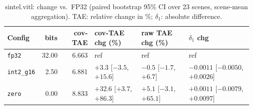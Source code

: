 \begin{table}[t]
\centering
\small
\caption{sintel.vitl: change vs.\ FP32 (paired bootstrap 95\% CI over 23 scenes, scene-mean aggregation). TAE: relative change in \%; $\delta_1$: absolute difference.}
\label{tab:boot_sintel_vitl_sm}
\begin{tabular}{lrrlll}
\toprule
Config & bits & cov-TAE & cov-TAE chg (\%) & raw TAE chg (\%) & $\delta_1$ chg \\
\midrule
\texttt{fp32} & 32.00 & 6.663 & ref & ref & ref \\
\texttt{int2\_g16} & 2.50 & 6.881 & $+3.3$ [$-3.5$, $+15.6$] & $-0.5$ [$-1.7$, $+6.7$] & $-0.0011$ [$-0.0050$, $+0.0026$] \\
\texttt{zero} & 0.00 & 8.833 & $+32.6$ [$+3.7$, $+86.3$] & $+5.1$ [$-3.1$, $+65.1$] & $+0.0011$ [$-0.0079$, $+0.0097$] \\
\bottomrule
\end{tabular}
\end{table}
